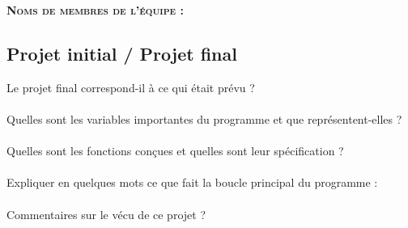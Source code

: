 \documentclass[a4paper,12pt,french]{article}
\begin{document}
\textbf{\textsc{Noms de membres de l'équipe :}}\\



\subsection*{Projet initial / Projet final}

Le projet final correspond-il à ce qui était prévu ? \\

\\

Quelles sont les variables importantes du programme  et que représentent-elles ?\\

\\


Quelles sont les fonctions conçues et quelles sont leur spécification ?\\

\\

Expliquer en quelques mots ce que fait la boucle principal du programme :\\

\\

Commentaires sur le vécu de ce projet ?\\

\end{document}
